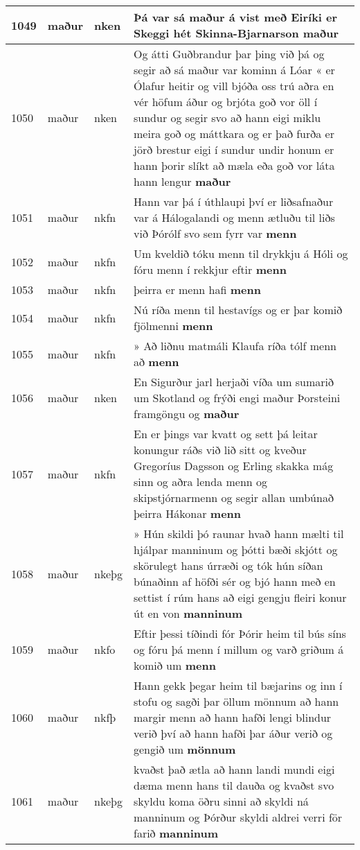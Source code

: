 \documentclass{article}
\begin{document}
\begin{longtable}{p{1cm}|p{1cm}|p{1cm}|p{13cm}}
\hline
1049&maður&nken&Þá var sá maður á vist með Eiríki er Skeggi hét Skinna-Bjarnarson \textbf{maður} \\
\hline
1050&maður&nken&Og átti Guðbrandur þar þing við þá og segir að sá maður var kominn á Lóar « er Ólafur heitir og vill bjóða oss trú aðra en vér höfum áður og brjóta goð vor öll í sundur og segir svo að hann eigi miklu meira goð og máttkara og er það furða er jörð brestur eigi í sundur undir honum er hann þorir slíkt að mæla eða goð vor láta hann lengur \textbf{maður} \\
\hline
1051&maður&nkfn&Hann var þá í úthlaupi því er liðsafnaður var á Hálogalandi og menn ætluðu til liðs við Þórólf svo sem fyrr var \textbf{menn} \\
\hline
1052&maður&nkfn&Um kveldið tóku menn til drykkju á Hóli og fóru menn í rekkjur eftir \textbf{menn} \\
\hline
1053&maður&nkfn&þeirra er menn hafi \textbf{menn} \\
\hline
1054&maður&nkfn&Nú ríða menn til hestavígs og er þar komið fjölmenni \textbf{menn} \\
\hline
1055&maður&nkfn&» Að liðnu matmáli Klaufa ríða tólf menn að \textbf{menn} \\
\hline
1056&maður&nken&En Sigurður jarl herjaði víða um sumarið um Skotland og frýði engi maður Þorsteini framgöngu og \textbf{maður} \\
\hline
1057&maður&nkfn&En er þings var kvatt og sett þá leitar konungur ráðs við lið sitt og kveður Gregoríus Dagsson og Erling skakka mág sinn og aðra lenda menn og skipstjórnarmenn og segir allan umbúnað þeirra Hákonar \textbf{menn} \\
\hline
1058&maður&nkeþg&» Hún skildi þó raunar hvað hann mælti til hjálpar manninum og þótti bæði skjótt og skörulegt hans úrræði og tók hún síðan búnaðinn af höfði sér og bjó hann með en settist í rúm hans að eigi gengju fleiri konur út en von \textbf{manninum} \\
\hline
1059&maður&nkfo&Eftir þessi tíðindi fór Þórir heim til bús síns og fóru þá menn í millum og varð griðum á komið um \textbf{menn} \\
\hline
1060&maður&nkfþ&Hann gekk þegar heim til bæjarins og inn í stofu og sagði þar öllum mönnum að hann margir menn að hann hafði lengi blindur verið því að hann hafði þar áður verið og gengið um \textbf{mönnum} \\
\hline
1061&maður&nkeþg&kvaðst það ætla að hann landi mundi eigi dæma menn hans til dauða og kvaðst svo skyldu koma öðru sinni að skyldi ná manninum og Þórður skyldi aldrei verri för farið \textbf{manninum} \\

\end{longtable}
\end{document}
